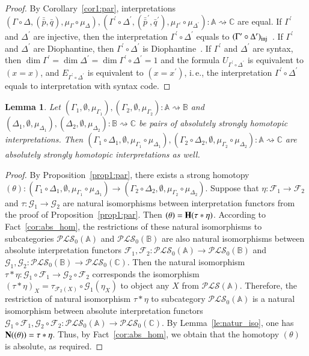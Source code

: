 \documentclass[12pt]{article}
\newtheorem{lemma}{Lemma}
\theoremstyle{definition}
\def\MA{{\mathbb{A}}}
\def\MB{{\mathbb{B}}}
\def\MC{{\mathbb{C}}}
\def\F{{\mathcal{F}}}
\def\G{{\mathcal{G}}}
\def\PLS{{\mathcal{PLS}}}
\begin{document}
\begin{proof}
By Corollary~\ref{cor1:par}, interpretations $(\Gamma\circ\Delta,(\bar{\bar p},\bar q),\mu_\Gamma\circ\mu_\Delta),(\Gamma^\prime\circ\Delta^\prime,(\bar{\bar p}^\prime,\bar q^\prime),\mu_{\Gamma^\prime}\circ\mu_{\Delta^\prime})\colon \MA\rightsquigarrow\MC$ are equal. If $\Gamma^\prime$ and $\Delta^\prime$ are injective, then the interpretation $\Gamma^\prime\circ\Delta^\prime$ equals to $(\Gamma^\prime\circ\Delta^\prime)_{\rm inj}$~\cite[Remark~3] {Th_int1}. If $\Gamma^\prime$ and $\Delta^\prime$ are Diophantine, then $\Gamma^\prime\circ\Delta^\prime$ is Diophantine~\cite[Remark~9]{Th_int1}. If $\Gamma^\prime$ and $\Delta^\prime$ are syntax, then $\dim\Gamma^\prime=\dim\Delta^\prime=\dim \Gamma^\prime\circ\Delta^\prime=1$ and the formula $U_{\Gamma^\prime\circ\Delta^\prime}$ is equivalent to $(x=x)$, and $E_{\Gamma^\prime\circ\Delta^\prime}$ is equivalent to $(x=x^\prime)$, i.\,e., the interpretation $\Gamma^\prime\circ\Delta^\prime$ equals to interpretation with syntax code.
\end{proof}

\begin{lemma}\label{lemma:abs}
Let $(\Gamma_1,\emptyset,\mu_{\Gamma_1}),(\Gamma_2,\emptyset,\mu_{\Gamma_2})\colon \MA\rightsquigarrow\MB$ and $(\Delta_1,\emptyset,\mu_{\Delta_1}),(\Delta_2,\emptyset,\mu_{\Delta_2})\colon \MB\rightsquigarrow\MC$ be pairs of absolutely strongly homotopic interpretations. Then $(\Gamma_1\circ\Delta_1,\emptyset,\mu_{\Gamma_1}\circ\mu_{\Delta_1}),(\Gamma_2\circ\Delta_2,\emptyset,\mu_{\Gamma_2}\circ\mu_{\Delta_2})\colon \MA\rightsquigarrow\MC$ are absolutely strongly homotopic interpretations as well.
\end{lemma}

\begin{proof}
By Proposition~\ref{prop1:par}, there exists a strong homotopy $(\theta)\colon (\Gamma_1\circ\Delta_1,\emptyset,\mu_{\Gamma_1}\circ\mu_{\Delta_1})\to (\Gamma_2\circ\Delta_2,\emptyset,\mu_{\Gamma_2}\circ\mu_{\Delta_2})$. Suppose that $\eta\colon \F_1\to\F_2$ and $\tau\colon\G_1\to\G_2$ are natural isomorphisms between interpretation functors from the proof of Proposition~\ref{prop1:par}. Then $(\theta)={\bf H}(\tau\ast\eta)$. According to Fact~\ref{cor:abs_hom}, the restrictions of these natural isomorphisms to subcategories $\PLS_0(\MA)$ and $\PLS_0(\MB)$ are also natural isomorphisms between absolute interpretation functors $\F_1,\F_2\colon\PLS_0(\MA)\to\PLS_0(\MB)$ and $\G_1,\G_2\colon\PLS_0(\MB)\to\PLS_0(\MC)$. Then the natural isomorphism $\tau\ast\eta\colon\G_1\circ\F_1\to\G_2\circ\F_2$ corresponds the isomorphism $(\tau\ast\eta)_X=\tau_{\F_2(X)}\circ\G_1(\eta_X)$ to object any $X$ from $\PLS(\MA)$. Therefore, the restriction of natural isomorphism $\tau\ast\eta$ to subcategory $\PLS_0(\MA)$ is a natural isomorphism between absolute interpretation functors $\G_1\circ\F_1,\G_2\circ\F_2\colon\PLS_0(\MA)\to\PLS_0(\MC)$. By Lemma~\ref{le:natur_iso}, one has ${\bf N}((\theta))=\tau\ast\eta$. Thus, by Fact~\ref{cor:abs_hom}, we obtain that the homotopy $(\theta)$ is absolute, as required.
\end{proof}
\end{document}
